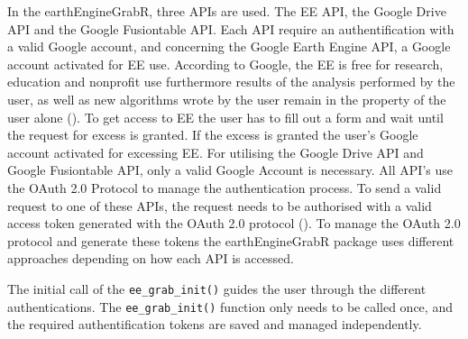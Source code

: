 In the earthEngineGrabR, three APIs are used. The EE API, the Google Drive API and the Google Fusiontable API. Each API require an authentification with a valid Google account, and concerning the Google Earth Engine API, a Google account activated for EE use. According to Google, the EE is free for research, education and nonprofit use furthermore results of the analysis performed by the user, as well as new algorithms wrote by the user remain in the property of the user alone (\cite{terms}).
To get access to EE the user has to fill out a form and wait until the request for excess is granted. If the excess is granted the user's Google account activated for excessing EE. For utilising the Google Drive API and Google Fusiontable API, only a valid Google Account is necessary. All API's use the OAuth 2.0 Protocol to manage the authentication process. To send a valid request to one of these APIs, the request needs to be authorised with a valid access token generated with the OAuth 2.0 protocol (\cite{hardt2012oauth}). To manage the OAuth 2.0 protocol and generate these tokens the earthEngineGrabR package uses different approaches depending on how each API is accessed. 

The initial call of the \texttt{ee\_grab\_init()} guides the user through the different authentications. The \texttt{ee\_grab\_init()} function only needs to be called once, and the required authentification tokens are saved and managed independently. 





